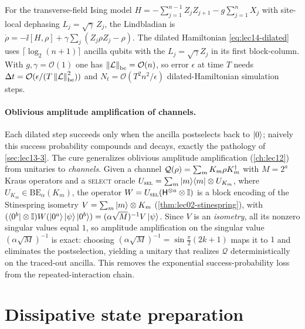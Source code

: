 \begin{example}
\label{exa:lec14-tfim}
For the transverse-field Ising model $H=-\sum_{j=1}^{n-1}Z_jZ_{j+1}-g\sum_{j=1}^n X_j$ with
site-local dephasing $L_j=\sqrt\gamma\,Z_j$, the Lindbladian is $\dot\rho=-\ii[H,\rho]+\gamma
\sum_j(Z_j\rho Z_j-\rho)$. The dilated Hamiltonian \eqref{eq:lec14-dilated} uses
$\lceil\log_2(n+1)\rceil$ ancilla qubits with the $L_j=\sqrt\gamma Z_j$ in its first
block-column. With $g,\gamma=\mathcal O(1)$ one has $\left\lVert \mathcal L \right\rVert_{\mathrm{be}}=\mathcal O(n)$,
so error $\epsilon$ at time $T$ needs $\Delta t=\mathcal O(\epsilon/(T\left\lVert \mathcal L \right\rVert
_{\mathrm{be}}^2))$ and $N_t=\mathcal O(T^2 n^2/\epsilon)$ dilated-Hamiltonian simulation steps.
\end{example}

\paragraph{Oblivious amplitude amplification of channels.}
Each dilated step succeeds only when the ancilla postselects back to $\ket0$; naively this
success probability compounds and decays, exactly the pathology of \cref{sec:lec13-3}. The cure
generalizes oblivious amplitude amplification (\cref{ch:lec12}) from unitaries to \emph{channels}.
Given a channel $\mathcal Q(\rho)=\sum_{m}K_m\rho K_m^{\dagger}$ with $M=2^a$ Kraus operators and a
\textsc{select} oracle $U_{\textsc{sel}}=\sum_m\ket{m}\!\bra{m}\otimes U_{K_m}$, where $U_{K_m}\in
\mathrm{BE}_\alpha(K_m)$, the operator $W=U_{\textsc{sel}}(\mathsf{H}^{\otimes a}\otimes\mathbb{I})$ is a
block encoding of the Stinespring isometry $V=\sum_m\ket m\otimes K_m$ (\cref{thm:lec02-stinespring}),
with $(\bra{0^b}\otimes\mathbb{I})W(\ket{0^a}\ket\psi\ket{0^b})=(\alpha\sqrt M)^{-1}V\ket\psi$. Since $V$
is an \emph{isometry}, all its nonzero singular values equal $1$, so amplitude amplification on
the singular value $(\alpha\sqrt M)^{-1}$ is exact: choosing $(\alpha\sqrt M)^{-1}=\sin\frac\pi
2(2k+1)$ maps it to $1$ and eliminates the postselection, yielding a unitary that realizes
$\mathcal Q$ deterministically on the traced-out ancilla. This removes the exponential
success-probability loss from the repeated-interaction chain.

\section{Dissipative state preparation}
\label{sec:lec14-3}

